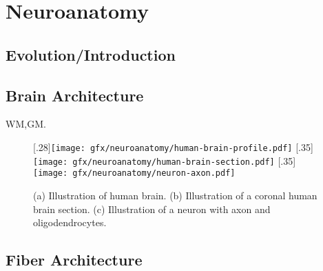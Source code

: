 \setcounter{chapter}{1}
\chapter{Neuroanatomy}
\label{sec:neuro}
%
%
\section{Evolution/Introduction}
%
\section{Brain Architecture}
% 
\ac{WM},\ac{GM}.
%
\begin{figure}[!t]
\centering
\subcaptionbox{}[.28\textwidth]{\texttt{[image: gfx/neuroanatomy/human-brain-profile.pdf]}}
\subcaptionbox{}[.35\textwidth]{\texttt{[image: gfx/neuroanatomy/human-brain-section.pdf]}}
\subcaptionbox{\label{fig:nerveFiber}}[.35\textwidth]{\texttt{[image: gfx/neuroanatomy/neuron-axon.pdf]}}
\caption{(a) Illustration of human brain. (b) Illustration of a coronal human brain section. (c) Illustration of a neuron with axon and oligodendrocytes.}
\label{fig:human-brain}
\end{figure}
%
\section{Fiber Architecture} \label{sec:fiberArchitecture}
%
